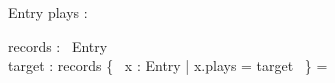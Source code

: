 \documentclass[a4paper,10pt,fleqn]{article}
\begin{document}
\begin{schema}{Entry}
plays : \nat
\end{schema}

\begin{axdef}
records : \seq~Entry \\
target : \nat
\where
records \filter \{~ x : Entry | x.plays = target ~\} = \langle \rangle
\end{axdef}
\end{document}
